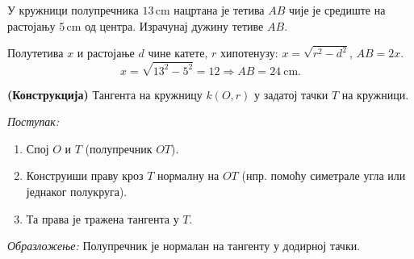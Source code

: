 \documentclass[11pt,a5paper,twoside,addpoints,noanswers]{exam} %
\newcommand{\measure}[2]{#1\,\mathrm{#2}}
\newcommand{\variant}[3]{#1}
\begin{document}
\begin{questions}
\question[3]
У кружници полупречника
\(\variant{\measure{13}{cm}}{\measure{10}{cm}}{\measure{12}{cm}}\)
нацртана је тетива $AB$ чије је средиште на растојању
\(\variant{\measure{5}{cm}}{\measure{6}{cm}}{\measure{9}{cm}}\)
од центра. Израчунај дужину тетиве $AB$.
\begin{solution}[\stretch 2]
Полутетива $x$ и растојање $d$ чине катете, $r$ хипотенузу:
$x=\sqrt{r^2-d^2}$, $AB=2x$.
\[
\variant{
x=\sqrt{13^2-5^2}=12\Rightarrow AB=24\ \mathrm{cm}
}{
x=\sqrt{10^2-6^2}=8\Rightarrow AB=16\ \mathrm{cm}
}{
x=\sqrt{12^2-9^2}= \sqrt{63}=3\sqrt{7}\Rightarrow AB=6\sqrt{7}\ \mathrm{cm}
}.
\]
\end{solution}

\ifprintanswers\else\newpage\fi

\question[3]
\variant{
\textbf{(Конструкција)} Тангента на кружницу $k(O,r)$ у задатој тачки $T$ на кружници.
}{
\textbf{(Конструкција)} Дата је кружница $k(O,r)$ и тачка $M$ у унутрашњости.
Конструиши тетиву којој је $M$ средиште.
}{
\textbf{(Конструкција)} Дата је кружница $k(O,r)$ и спољашња тачка $P$.
Конструиши тангенте из $P$ на $k$.
}
\begin{solution}[\stretch 6]
\variant{
\emph{Поступак:}
\begin{enumerate}\item Спој $O$ и $T$ (полупречник $OT$).
\item Конструиши праву кроз $T$ нормалну на $OT$ (нпр. помоћу симетрале угла или једнаког полукруга).
\item Та права је тражена тангента у $T$.
\end{enumerate}
\emph{Образложење:} Полупречник је нормалан на тангенту у додирној тачки.
}{
\emph{Поступак:}
\begin{enumerate}\item Нацртај праву $OM$.
\item На прави кроз $M$ конструиши нормалу на $OM$.
\item Пресеци те нормале са кружницом су крајеви тражене тетиве $AB$.
\end{enumerate}
\emph{Образложење:} Средиште тетиве лежи на нормали на тетиву кроз центар; дакле $OM\perp AB$ и $M$ је средина $AB$.
}{
\emph{Поступак (тангента из спољашње тачке):}
\begin{enumerate}
\item Спој $O$ и $P$.
\item Конструиши симетралу дужи $OP$; нека је $S$ њено средиште.
\item Описана кружница $k_S(S,SO)$ сече $k$ у додирним тачкама $T_1,T_2$.
\item Права $PT_1$ и $PT_2$ су тражене тангенте.
\end{enumerate}
\emph{Образложење:} $ST_1=SO=SP$, па је $\angle OT_1P$ прав (Талесова теорема), те $PT_1\perp OT_1$.
}
\end{solution}


\end{questions}
\end{document}
